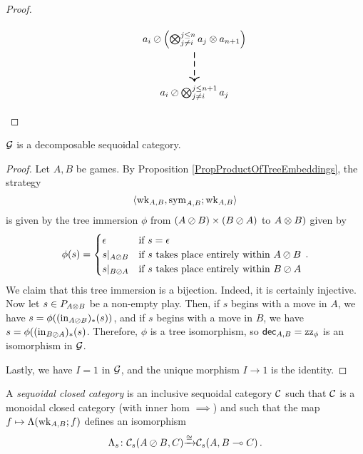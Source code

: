 \documentclass[11pt]{report}
\begin{document}
\begin{proof}
\begin{SidewaysFigure}
\[\begin{tikzcd}[ampersand replacement=\&, column sep=6pt, row sep=30pt]
          \&
            \&
              \& |[alias=Y]| a_i \sequoid \left(\Tensor_{j\ne i}^{j\le n} a_j \tensor a_{n+1}\right) \arrow[d, thick, dashed] \\
          \&
            \&
              \& a_i \sequoid \Tensor_{j\ne i}^{j\le n+1}a_j
      \end{tikzcd}
      \]
    \caption[Diagram used in the proof of Proposition \ref{PropDecSeqFormula}]{Diagram used in the proof of Proposition \ref{PropDecSeqFormula}.  
    The pentagon at the heart of the diagram is the coherence diagram for $\passoc$ and $\wk$ from Definition \ref{DefSequoidalCategory}.}
    \label{FigDecSeqFormula}
  \end{SidewaysFigure}
\end{proof}

\begin{proposition}
  $\mathcal G$ is a decomposable sequoidal category.
\end{proposition}
\begin{proof}
  Let $A,B$ be games.  
  By Proposition \ref{PropProductOfTreeEmbeddings}, the strategy 
  \[
    \langle \operatorname{wk}_{A,B},\operatorname{sym}_{A,B};\operatorname{wk}_{A,B}\rangle
    \]
  is given by the tree immersion $\phi$ from $(A \oslash B) \times (B \oslash A)$ to $A \otimes B)$ given by
  \[
    \phi(s) = \begin{cases}
      \epsilon & \text{if $s=\epsilon$} \\
      s\vert_{A \oslash B} & \text{if $s$ takes place entirely within $A\oslash B$} \\
      s\vert_{B \oslash A} & \text{if $s$ takes place entirely within $B\oslash A$}
    \end{cases}\,.
    \]
  We claim that this tree immersion is a bijection.  
  Indeed, it is certainly injective.
  Now let $s\in P_{A\otimes B}$ be a non-empty play.  
  Then, if $s$ begins with a move in $A$, we have $s=\phi((\operatorname{in}_{A\oslash B})_*(s))$, and if $s$ begins with a move in $B$, we have $s=\phi((\operatorname{in}_{B\oslash A})_*(s)$.  
  Therefore, $\phi$ is a tree isomorphism, so $\operatorname{{\mathsf{dec}}}_{A,B}=\operatorname{zz}_\phi$ is an isomorphism in $\mathcal G$.

  Lastly, we have $I=1$ in $\mathcal G$, and the unique morphism $I\to 1$ is the identity.
\end{proof}

\begin{definition}
  A \emph{sequoidal closed category} is an inclusive sequoidal category ${\mathcal{C}}$ such that ${\mathcal{C}}$ is a monoidal closed category (with inner hom $\implies$) and such that the map $f\mapsto \Lambda(\operatorname{wk}_{A,B};f)$ defines an isomorphism
  \[
    \Lambda_s \colon {\mathcal{C}}_s(A \oslash B,C) {\xrightarrow{\cong}} {\mathcal{C}}_s(A,B\multimap C)\,.
    \]
\end{definition}
\end{document}

